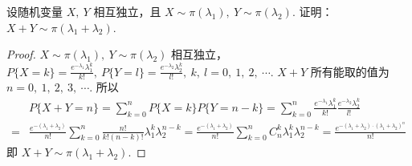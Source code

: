 \begin{problem}[本题6分]
  设随机变量 $X,~ Y$ 相互独立，且 $X \sim \pi(\lambda_1),~ Y \sim \pi(\lambda_2)$.
  证明：$X + Y \sim \pi(\lambda_1 + \lambda_2)$.
\end{problem}
\begin{solution}
  \begin{proof}
    $X \sim \pi(\lambda_1),~ Y \sim \pi(\lambda_2)$ 相互独立，
    $ P\{X = k\} = \frac{e^{-\lambda_1} \lambda_1^k}{k!},~
      P\{Y = l\} = \frac{e^{-\lambda_2} \lambda_2^k}{l!},~ k,~ l = 0,~ 1,~ 2,~ \cdots$.
    $X + Y$ 所有能取的值为 $n = 0,~ 1,~ 2,~ 3,~ \cdots$. 所以
    \begin{align*}
        & P\{X + Y = n\}
      = \sum_{k = 0}^n P\{X = k\} P\{Y = n - k\}
      = \sum_{k = 0}^n \frac{e^{-\lambda_1} \lambda_1^k}{k!}
                       \frac{e^{-\lambda_2} \lambda_2^k}{l!}\\
      = & \frac{e^{-(\lambda_1 + \lambda_2)}}{n!}
        \sum_{k = 0}^n \frac{n!}{k!(n - k)!} \lambda_1^k \lambda_2^{n - k}
      = \frac{e^{-(\lambda_1 + \lambda_2)}}{n!}
        \sum_{k = 0}^n C_n^k \lambda_1^k \lambda_2^{n - k}
      = \frac{e^{-(\lambda_1 + \lambda_2) \cdot (\lambda_1 + \lambda_2)^n}}{n!}
    \end{align*}
    即 $X + Y \sim \pi(\lambda_1 + \lambda_2)$.
  \end{proof}
\end{solution}